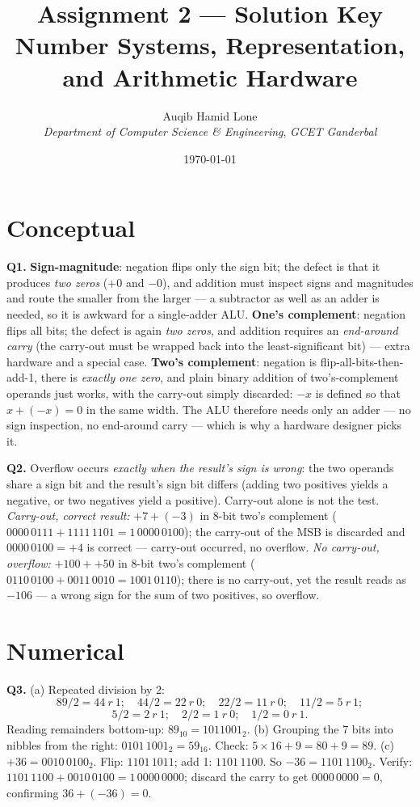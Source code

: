 \documentclass[11pt]{article}
\title{Assignment 2 --- Solution Key\\\large Number Systems, Representation, and Arithmetic Hardware}
\author{Auqib Hamid Lone\\[0.3em]
  \emph{Department of Computer Science \& Engineering}, \emph{GCET Ganderbal}}
\date{\today}
\begin{document}
\maketitle

\section{Conceptual}

\textbf{Q1.} \textbf{Sign-magnitude}: negation flips only the sign bit; the defect is that it produces \emph{two zeros} ($+0$ and $-0$), and addition must inspect signs and magnitudes and route the smaller from the larger --- a subtractor as well as an adder is needed, so it is awkward for a single-adder ALU. \textbf{One's complement}: negation flips all bits; the defect is again \emph{two zeros}, and addition requires an \emph{end-around carry} (the carry-out must be wrapped back into the least-significant bit) --- extra hardware and a special case. \textbf{Two's complement}: negation is flip-all-bits-then-add-1, there is \emph{exactly one zero}, and plain binary addition of two's-complement operands just works, with the carry-out simply discarded: $-x$ is defined so that $x + (-x) = 0$ in the same width. The ALU therefore needs only an adder --- no sign inspection, no end-around carry --- which is why a hardware designer picks it.

\textbf{Q2.} Overflow occurs \emph{exactly when the result's sign is wrong}: the two operands share a sign bit and the result's sign bit differs (adding two positives yields a negative, or two negatives yield a positive). Carry-out alone is not the test. \emph{Carry-out, correct result:} $+7 + (-3)$ in 8-bit two's complement ($0000\,0111 + 1111\,1101 = 1\,0000\,0100$); the carry-out of the MSB is discarded and $0000\,0100 = +4$ is correct --- carry-out occurred, no overflow. \emph{No carry-out, overflow:} $+100 + +50$ in 8-bit two's complement ($0110\,0100 + 0011\,0010 = 1001\,0110$); there is no carry-out, yet the result reads as $-106$ --- a wrong sign for the sum of two positives, so overflow.

\section{Numerical}

\textbf{Q3.} (a) Repeated division by 2:
\[
89/2 = 44\ r\ 1;\quad 44/2 = 22\ r\ 0;\quad 22/2 = 11\ r\ 0;\quad 11/2 = 5\ r\ 1;
\]
\[
5/2 = 2\ r\ 1;\quad 2/2 = 1\ r\ 0;\quad 1/2 = 0\ r\ 1.
\]
Reading remainders bottom-up: $89_{10} = 1011001_2$.
(b) Grouping the 7 bits into nibbles from the right: $0101\,1001_2 = 59_{16}$. Check: $5\times 16 + 9 = 80 + 9 = 89$. 
(c) $+36 = 0010\,0100_2$. Flip: $1101\,1011$; add 1: $1101\,1100$. So $-36 = 1101\,1100_2$. Verify: $1101\,1100 + 0010\,0100 = 1\,0000\,0000$; discard the carry to get $0000\,0000 = 0$, confirming $36 + (-36) = 0$.
\end{document}
